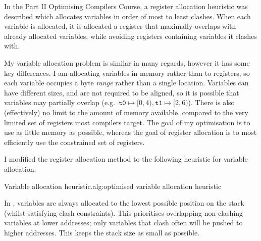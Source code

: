 \documentclass[00-main.tex]{subfiles}
\begin{document}
In the Part II Optimising Compilers Course, a register allocation heuristic was described which allocates variables in order of most to least clashes.
When each variable is allocated, it is allocated a register that maximally overlaps with already allocated variables, while avoiding registers containing variables it clashes with.

My variable allocation problem is similar in many regards, however it has some key differences.
I am allocating variables in memory rather than to registers, so each variable occupies a byte \emph{range} rather than a single location.
Variables can have different sizes, and are not required to be aligned, so it is possible that variables may partially overlap (e.g.~$\texttt{t0} \mapsto [0, 4), \texttt{t1} \mapsto [2, 6)$). %
There is also (effectively) no limit to the amount of memory available, compared to the very limited set of registers most compilers target.
The goal of my optimisation is to use as little memory as possible, whereas the goal of register allocation is to most efficiently use the constrained set of registers.

I modified the register allocation method to the following heuristic for variable allocation:

\begin{Algorithm}{Variable allocation heuristic.}{alg:optimised variable allocation heuristic}
\end{Algorithm}

In , variables are always allocated to the lowest possible position on the stack (whilst satisfying clash constraints).
This prioritises overlapping non-clashing variables at lower addresses; only variables that clash often will be pushed to higher addresses.
This keeps the stack size as small as possible.
\end{document}
